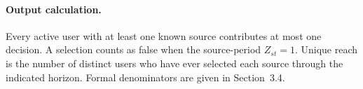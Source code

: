 \paragraph{Output calculation.} Every active user with at least one known source contributes at most one decision. A selection counts as false when the source-period $Z_{st}=1$. Unique reach is the number of distinct users who have ever selected each source through the indicated horizon. Formal denominators are given in Section~3.4.



